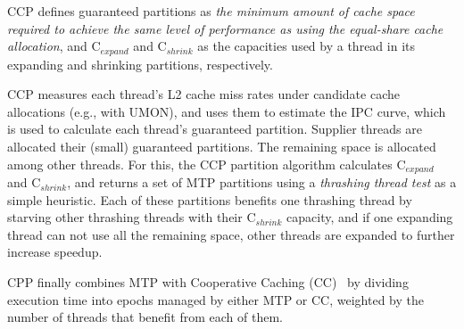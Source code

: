 CCP defines guaranteed partitions as \textit{the minimum amount of cache space required to achieve the same level of performance as using the equal-share cache allocation}, and C$_{expand}$ and C$_{shrink}$ as the capacities used by a thread in its expanding and shrinking partitions, respectively. 

CCP measures each thread's L2 cache miss rates under candidate cache allocations (e.g., with UMON), and uses them to estimate the IPC curve, which is used to calculate each thread's guaranteed partition. 
Supplier threads are allocated their (small) guaranteed partitions.
The remaining space is allocated among other threads.
For this, the CCP partition algorithm calculates C$_{expand}$ and C$_{shrink}$, and returns a set of MTP partitions using a \textit{thrashing thread test} as a simple heuristic.
Each of these partitions benefits one thrashing thread by starving other thrashing threads with their C$_{shrink}$ capacity, and if one expanding thread can not use all the remaining space, other threads are expanded to further increase speedup. 

CPP finally combines MTP with Cooperative Caching (CC)~\cite{chang06} by dividing execution time into epochs managed by either MTP or CC, weighted by the number of threads that benefit from each of them.
